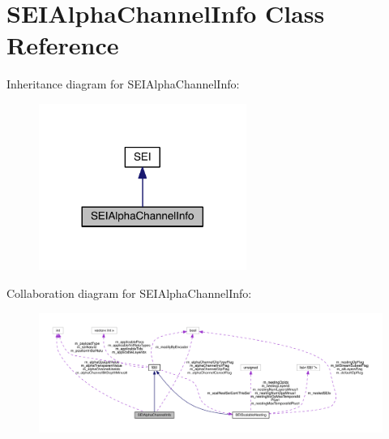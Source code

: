 \hypertarget{class_s_e_i_alpha_channel_info}{}\section{S\+E\+I\+Alpha\+Channel\+Info Class Reference}
\label{class_s_e_i_alpha_channel_info}


Inheritance diagram for S\+E\+I\+Alpha\+Channel\+Info\+:
\nopagebreak
\begin{figure}[H]
\begin{center}
\leavevmode
\includegraphics[width=192pt]{db/d18/class_s_e_i_alpha_channel_info__inherit__graph}
\end{center}
\end{figure}


Collaboration diagram for S\+E\+I\+Alpha\+Channel\+Info\+:
\nopagebreak
\begin{figure}[H]
\begin{center}
\leavevmode
\includegraphics[width=350pt]{de/d55/class_s_e_i_alpha_channel_info__coll__graph}
\end{center}
\end{figure}

